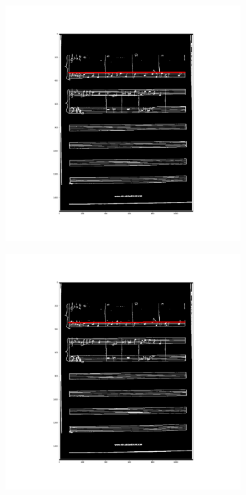 \documentclass[12pt]{article}
\begin{document}
\begin{figure}[h!]
\begin{subfigure}[b]{0.32\linewidth}
		\end{subfigure}
		\begin{subfigure}[b]{0.32\linewidth}
			\includegraphics[width=\linewidth]{zdj/BFS6.png}
		\end{subfigure}
		\begin{subfigure}[b]{0.32\linewidth}
			\includegraphics[width=\linewidth]{zdj/BFS7.png}

\end{subfigure}
\end{figure}
\end{document}
